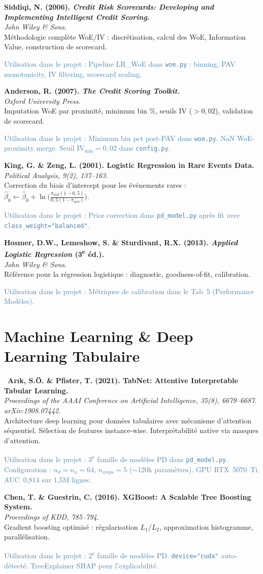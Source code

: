 \documentclass[12pt,a4paper]{article}
\newcommand{\bibentry}[4]{%
  \noindent\textbf{#1}\\
  \textit{#2}\\
  #3\par
  \textcolor{steelblue}{\footnotesize\textsf{Utilisation dans le projet :} #4}\par
  \medskip
}
\newcommand{\bibentrystar}[4]{%
  \noindent{\color{goldstar}$\bigstar$}~\textbf{#1}\\
  \textit{#2}\\
  #3\par
  \textcolor{steelblue}{\footnotesize\textsf{Utilisation dans le projet :} #4}\par
  \medskip
}
\begin{document}
\bibentry{Siddiqi, N. (2006). \emph{Credit Risk Scorecards: Developing and Implementing Intelligent Credit Scoring.}}{John Wiley \& Sons.}{Méthodologie complète WoE/IV : discrétisation, calcul des WoE, Information Value, construction de scorecard.}{Pipeline LR\_WoE dans \texttt{woe.py} : binning, PAV monotonicity, IV filtering, scorecard scaling.}

\bibentry{Anderson, R. (2007). \emph{The Credit Scoring Toolkit.}}{Oxford University Press.}{Imputation WoE par proximité, minimum bin \%, seuils IV ($>0{,}02$), validation de scorecard.}{Minimum bin pct post-PAV dans \texttt{woe.py}. NaN WoE-proximity merge. Seuil $\text{IV}_\text{min} = 0{,}02$ dans \texttt{config.py}.}

\bibentry{King, G. \& Zeng, L. (2001). Logistic Regression in Rare Events Data.}{\emph{Political Analysis}, 9(2), 137--163.}{Correction du biais d'intercept pour les événements rares : $\hat{\beta}_0 \leftarrow \hat{\beta}_0 + \ln\!\big(\frac{\pi_\text{réel}(1-0{,}5)}{0{,}5(1-\pi_\text{réel})}\big)$.}{Prior correction dans \texttt{pd\_model.py} après fit avec \texttt{class\_weight="balanced"}.}

\bibentry{Hosmer, D.W., Lemeshow, S. \& Sturdivant, R.X. (2013). \emph{Applied Logistic Regression} (3\textsuperscript{e} éd.).}{John Wiley \& Sons.}{Référence pour la régression logistique : diagnostic, goodness-of-fit, calibration.}{Métriques de calibration dans le Tab~5 (Performance Modèles).}

\section{Machine Learning \& Deep Learning Tabulaire}

\bibentrystar{Ar\i{}k, S.Ö. \& Pfister, T. (2021). TabNet: Attentive Interpretable Tabular Learning.}{\emph{Proceedings of the AAAI Conference on Artificial Intelligence}, 35(8), 6679--6687. arXiv:1908.07442.}{Architecture deep learning pour données tabulaires avec mécanisme d'attention séquentiel. Sélection de features instance-wise. Interprétabilité native via masques d'attention.}{3\textsuperscript{e} famille de modèles PD dans \texttt{pd\_model.py}. Configuration : $n_d = n_a = 64$, $n_\text{steps} = 5$ ($\sim$120k paramètres). GPU RTX~5070~Ti. AUC~0,814 sur 1,5M lignes.}

\bibentry{Chen, T. \& Guestrin, C. (2016). XGBoost: A Scalable Tree Boosting System.}{\emph{Proceedings of KDD}, 785--794.}{Gradient boosting optimisé : régularisation $L_1$/$L_2$, approximation histogramme, parallélisation.}{2\textsuperscript{e} famille de modèles PD. \texttt{device="cuda"} auto-détecté. TreeExplainer SHAP pour l'explicabilité.}
\end{document}
